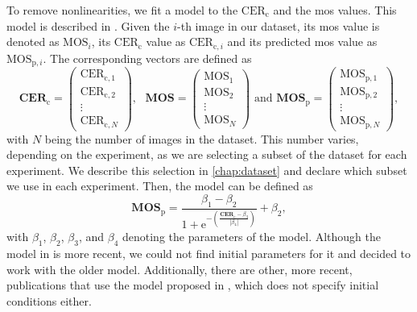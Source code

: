 To remove nonlinearities, we fit a model to the $\text{CER}_{\text{c}}$ and the \gls{mos} values.
This model is described in \cite{nonlin_fit_model_init_2000}\cite{nonlin_fit_appl_2017}.
Given the $i$-th image in our dataset, its \gls{mos} value is denoted as $\text{MOS}_{i}$, its $\text{CER}_{\text{c}}$ value as $\text{CER}_{\text{c},i}$ and its predicted \gls{mos} value as $\text{MOS}_{\text{p},i}$.
The corresponding vectors are defined as
\begin{equation}
    \mathbf{CER}_{\text{c}} =
    \begin{pmatrix}
        \text{CER}_{\text{c},1} \\
        \text{CER}_{\text{c},2} \\
        \vdots \\
        \text{CER}_{\text{c},N}
    \end{pmatrix},\text{ }
    \mathbf{MOS} =
    \begin{pmatrix}
        \text{MOS}_{1} \\
        \text{MOS}_{2} \\
        \vdots \\
        \text{MOS}_{N}
    \end{pmatrix} \text{ and }
    \mathbf{MOS}_{\text{p}} =
    \begin{pmatrix}
        \text{MOS}_{\text{p},1} \\
        \text{MOS}_{\text{p},2} \\
        \vdots \\
        \text{MOS}_{\text{p},N}
    \end{pmatrix},
\end{equation}
with $N$ being the number of images in the dataset.
This number varies, depending on the experiment, as we are selecting a subset of the dataset for each experiment.
We describe this selection in \autoref{chap:dataset} and declare which subset we use in each experiment.
Then, the model can be defined as
\begin{equation}
    \mathbf{MOS}_{\text{p}} = \frac{\beta_{1}-\beta_{2}}{1 + \text{e}^{-\left(\frac{\mathbf{CER}_{\text{c}}-\beta_{3}}{|\beta_{4}|}\right)}} + \beta_{2},
    \label{eq:nonlinear}
\end{equation}
with $\beta_{1}$, $\beta_{2}$, $\beta_{3}$, and $\beta_{4}$ denoting the parameters of the model.
Although the model in \cite{nonlin_fit_original_2003} is more recent, we could not find initial parameters for it and decided to work with the older model.
Additionally, there are other, more recent, publications \cite{ni_esim_2017, nonlin_fit_appl_2017, nonlin_fit_appl_2018, nonlin_fit_appl_2014, fsim_2011, nonlin_fit_appl_2015, doc_quality_survey_2023, iqa_database_2023, nonlin_fit_appl_2016} that use the model proposed in \cite{nonlin_fit_new_model_2006}, which does not specify initial conditions either.
